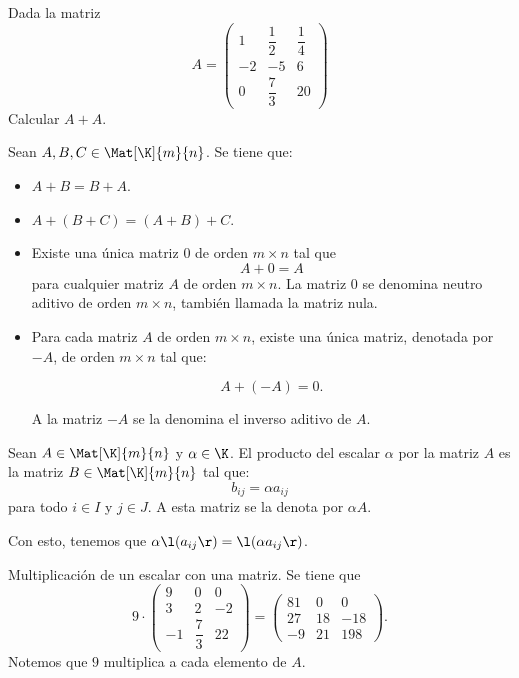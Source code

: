 \documentclass[compacto,10pt]{pubciencias-notas}
\begin{document}
\begin{ejer}\hspace{0pt}\label{Ejer:Sem01Clas01SumaMat} Dada la matriz
\[
    A = 
    \begin{pmatrix}
    1&\dfrac{1}{2}&\dfrac{1}{4}\\
    -2&-5&6\\
    0&\dfrac{7}{3}&20
    \end{pmatrix}   
\] 
Calcular $A + A$.
\end{ejer}
\begin{teo}\label{Teo:Sem01Clas01PropSum}
    Sean $A,B,C\in\Mat[\K]{m}{n}$. Se tiene que:
    
    \begin{itemize}
    \item[$a)$]    
        $A + B = B + A$.        
    \item[$b)$]    
        $A + (B+C) = (A + B)+C$.
    \item[$c)$] 
        Existe una única matriz $0$ de orden $m \times n$ tal que 
        \[ 
            A + 0 =  A 
        \]
        para cualquier matriz $A$ de orden $m \times n$. La matriz $0$ se denomina neutro aditivo de orden $m \times n$, también llamada la matriz nula.
    \item[$d)$] 
        Para cada matriz $A$ de orden $m \times n$, existe una única matriz, denotada por $-A$, de orden $m \times n$ tal que:
        
        \[
            A + (-A) = 0.
        \]
        
        A la matriz $-A$ se la denomina el inverso aditivo de $A$.
    \end{itemize}
\end{teo}

\begin{defi}
Sean $A\in \Mat[\K]{m}{n}$ y $\alpha \in \K$. El producto del escalar $\alpha$ por la matriz $A$ es la matriz $B\in \Mat[\K]{m}{n}$ tal que:
\[ 
    b_{ij} = \alpha a_{ij}
\]
para todo $i \in I$ y $j \in J$. A esta matriz se la denota por $\alpha A$.
\end{defi}

\begin{advertencia}
Con esto, tenemos que $\alpha \l(a_{ij}\r) =\l(\alpha a_{ij}\r)$.
\end{advertencia}

\begin{ejem} Multiplicación de un escalar con una matriz. Se tiene que
\[ 
    9\cdot
    \begin{pmatrix}9&0&0\\3&2&-2\\-1&\dfrac{7}{3}&22\end{pmatrix}
    =
    \begin{pmatrix}81&0&0\\27&18&-18\\-9&21&198\end{pmatrix}.
\]
Notemos que $9$ multiplica a cada elemento de $A$.
\end{ejem}
\end{document}
